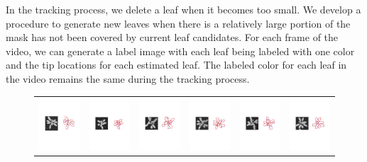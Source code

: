 In the tracking process, we delete a leaf when it becomes too small.
We develop a procedure to generate new leaves when there is a relatively large portion of the mask has not been covered by current leaf candidates.
For each frame of the video, we can generate a label image with each leaf being labeled with one color and the tip locations for each estimated leaf.
The labeled color for each leaf in the video remains the same during the tracking process.


\begin{figure}
\begin{centering}
\begin{tabular}{c c c c c c}
\includegraphics[width=.14\textwidth]{Figures/AlignPerformance/9_1}&
\includegraphics[width=.14\textwidth]{Figures/AlignPerformance/10_1}&
\includegraphics[width=.14\textwidth]{Figures/AlignPerformance/11_1}&
\includegraphics[width=.14\textwidth]{Figures/AlignPerformance/12_1}&
\includegraphics[width=.14\textwidth]{Figures/AlignPerformance/14_1}&
\includegraphics[width=.14\textwidth]{Figures/AlignPerformance/15_1}\\


\end{tabular}
\end{centering}
\end{figure}
